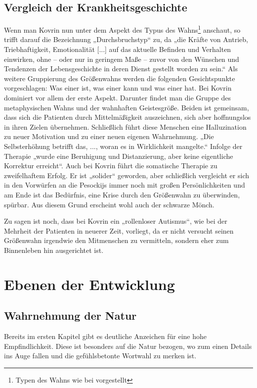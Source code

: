 \documentclass[12pt,headsepline,a4paper]{scrartcl}
\begin{document}
\subsection{Vergleich der Krankheitsgeschichte}
Wenn man Kovrin nun unter dem Aspekt des Typus des Wahns\footnote{Typen des Wahns wie bei \autocite{avenarius} vorgestellt} anschaut, so trifft darauf die
Bezeichnung „Durchsbruchstyp“ zu, da „die Kräfte von Antrieb, Triebhaftigkeit, Emotionalität [...]
auf das aktuelle Befinden und Verhalten einwirken, ohne -- oder nur in geringem Maße -- zuvor von
den Wünschen und Tendenzen der Lebensgeschichte in deren Dienst gestellt worden zu sein.“\autocite[73]{avenarius}
Als weitere Gruppierung des Größenwahns werden die folgenden Gesichtspunkte vorgeschlagen:
Was einer ist, was einer kann und was einer hat.\autocite[23]{avenarius} Bei Kovrin dominiert vor allem der erste Aspekt.
Darunter findet man die Gruppe des metaphysischen Wahns und der wahnhaften Geistesgröße.
Beiden ist gemeinsam, dass sich die Patienten durch Mittelmäßigkeit auszeichnen, sich aber
hoffnungslos in ihren Zielen übernehmen. Schließlich führt diese Menschen eine Halluzination zu
neuer Motivation und zu einer neuen eigenen Wahrnehmung. „Die Selbsterhöhung betrifft das, ...,
woran es in Wirklichkeit mangelte.“\autocite[24]{avenarius} Infolge der Therapie „wurde eine Beruhigung und
Distanzierung, aber keine eigentliche Korrektur erreicht“\autocite[24]{avenarius}. Auch bei Kovrin führt die somatische
Therapie zu zweifelhaftem Erfolg. Er ist „solider“ geworden, aber schließlich vergleicht er sich in
den Vorwürfen an die Pesockijs immer noch mit großen Persönlichkeiten und am Ende ist das
Bedürfnis, eine Krise durch den Größenwahn zu überwinden, spürbar. Aus diesem Grund erscheint
wohl auch der schwarze Mönch.

Zu sagen ist noch, dass bei Kovrin ein „rollenloser Autismus“\autocite{avenarius}, wie bei der Mehrheit der Patienten in
neuerer Zeit, vorliegt, da er nicht versucht seinen Größenwahn irgendwie den Mitmenschen zu
vermitteln, sondern eher zum Binnenleben hin ausgerichtet ist.
\section{Ebenen der Entwicklung}
\subsection{Wahrnehmung der Natur}
Bereits im ersten Kapitel gibt es deutliche Anzeichen für eine hohe Empfindlichkeit. Diese ist
besonders auf die Natur bezogen, wo zum einen Details ins Auge fallen und die gefühlsbetonte
Wortwahl zu merken ist.
\end{document}
